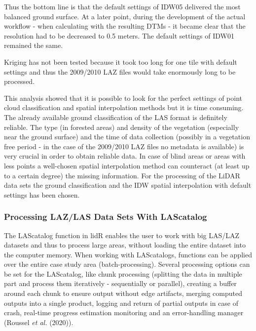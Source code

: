 \documentclass[
  12pt,
]{article}
\begin{document}
Thus the bottom line is that the default settings of IDW05 delivered the most balanced ground surface. At a later point, during the development of the actual workflow - when calculating with the resulting DTMs - it became clear that the resolution had to be decreased to 0.5 meters. The default settings of IDW01 remained the same.

Kriging has not been tested because it took too long for one tile with default settings and thus the 2009/2010 LAZ files would take enormously long to be processed.

This analysis showed that it is possible to look for the perfect settings of point cloud classification and spatial interpolation methods but it is time consuming. The already available ground classification of the LAS format is definitely reliable. The type (in forested areas) and density of the vegetation (especially near the ground surface) and the time of data collection (possibly in a vegetation free period - in the case of the 2009/2010 LAZ files no metadata is available) is very crucial in order to obtain reliable data. In case of blind areas or areas with less points a well-chosen spatial interpolation method can counteract (at least up to a certain degree) the missing information.
For the processing of the LiDAR data sets the ground classification and the IDW spatial interpolation with default settings has been chosen.

\hypertarget{processing-lazlas-data-sets-with-lascatalog}{%
\subsubsection{\texorpdfstring{\textbf{Processing LAZ/LAS Data Sets With LAScatalog}}{Processing LAZ/LAS Data Sets With LAScatalog}}\label{processing-lazlas-data-sets-with-lascatalog}}

The LAScatalog function in lidR enables the user to work with big LAS/LAZ datasets and thus to process large areas, without loading the entire dataset into the computer memory. When working with LAScatalogs, functions can be applied over the entire case study area (batch-processing). Several processing options can be set for the LAScatalog, like chunk processing (splitting the data in multiple part and process them iteratively - sequentially or parallel), creating a buffer around each chunk to ensure output without edge artifacts, merging computed outputs into a single product, logging and return of partial outputs in case of crash, real-time progress estimation monitoring and an error-handling manager (Roussel \emph{et al.} (2020)).
\end{document}
